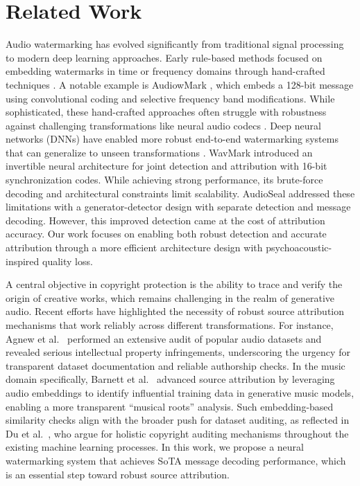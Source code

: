 \section{Related Work}
\label{sec.related}

 Audio watermarking has evolved significantly from traditional signal processing to modern deep learning approaches. Early rule-based methods focused on embedding watermarks in time or frequency domains through hand-crafted techniques \cite{zhang2020time, hu2020selection, zhang2017robust, qin2022lattice}. A notable example is AudiowMark \cite{Westerfeld_audiowmark}, which embeds a 128-bit message using convolutional coding and selective frequency band modifications. While sophisticated, these hand-crafted approaches often struggle with robustness against challenging transformations like neural audio codecs \citep{defossez2022high}. Deep neural networks (DNNs) have enabled more robust end-to-end watermarking systems that can generalize to unseen transformations \citep{san2024proactive,chen2023wavmark,liu2023detecting}. WavMark \cite{chen2023wavmark} introduced an invertible neural architecture for joint detection and attribution with 16-bit synchronization codes. While achieving strong performance, its brute-force decoding and architectural constraints limit scalability. AudioSeal \cite{san2024proactive} addressed these limitations with a generator-detector design with separate detection and message decoding. However, this improved detection came at the cost of attribution accuracy. Our work focuses on enabling both robust detection and accurate attribution through a more efficient architecture design with psychoacoustic-inspired quality loss.

 A central objective in copyright protection is the ability to trace and verify the origin of creative works, which remains challenging in the realm of generative audio. Recent efforts have highlighted the necessity of robust source attribution mechanisms that work reliably across different transformations. For instance, Agnew et al.~\cite{agnew2024sound} performed an extensive audit of popular audio datasets and revealed serious intellectual property infringements, underscoring the urgency for transparent dataset documentation and reliable authorship checks. In the music domain specifically, Barnett et al.~\cite{barnett2024exploring} advanced source attribution by leveraging audio embeddings to identify influential training data in generative music models, enabling a more transparent ``musical roots'' analysis. Such embedding-based similarity checks align with the broader push for dataset auditing, as reflected in Du et al.~\cite{du2024sok}, who argue for holistic copyright auditing mechanisms throughout the existing machine learning processes. In this work, we propose a neural watermarking system that achieves SoTA message decoding performance, which is an essential step toward robust source attribution.

